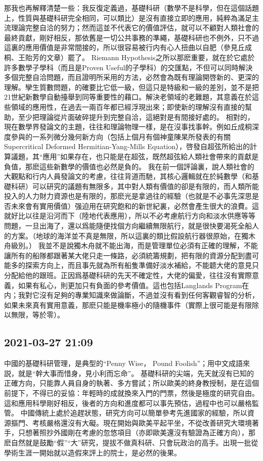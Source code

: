 \documentclass[twocolumn]{ctexart}
\begin{document}
那我也再解釋清楚一些：我反復定義過，基礎科研（數學不是科學，但在這個話題上，性質與基礎科研完全相同，可以類比）是沒有直接立即的應用，純粹為滿足主流理論完整自洽的努力；然而這並不代表它的價值評估，就可以不顧對人類社會的最終貢獻，剛好相反，那依舊是一切公共事務的準繩，基礎科研也不例外，只不過這裏的應用價值是非常間接的，所以很容易被行内有心人扭曲以自肥（參見丘成桐、王貽芳的文章）罷了。
Riemann Hypothesis之所以那麽重要，就在於它處於許多數學子學科（而且是Proven Useful的子學科）的交匯點，不但可以同時解決多個完整自洽問題，而且證明所采用的方法，必然會為既有理論開啓新的、更深的理解。孿生質數問題，的確要比它低一級，但這只是特級和一級的差別，並不是把21世紀新數學自動擡舉到同等重要性的藉口。解決老領域的老難題，其意義在於這些領域的應用性，在過去一兩百年都已經浮現出來；即使新的理解沒有直接的幫助，至少把理論從片面破碎提升到完整自洽，這絕對是有間接好處的。
相對的，現在數學界發論文的主題，往往和理論物理一樣，是在沒事找事幹。例如丘成桐深度參與的一系列微分幾何新方向（包括上個月有個神童陳杲所發表的有關Supercritical Deformed Hermitian-Yang-Mills Equation），啓發自超弦所給出的計算議題，其“應用”如果存在，也只能是在超弦，既然超弦給人類社會帶來的貢獻是負值，那麽這些新數學的價值也必然是負的。
我在前一個評論裏，說人類社會的大觀點和行内人員發論文的考慮，往往背道而馳，其核心邏輯就在於純數學（和基礎科研）可以研究的議題有無限多，其中對人類有價值的卻是有限的，而人類所能投入的人力財力資源也是有限的，那麽光是拿過往的經驗（也就是不必事先深思是否未來會有實用價值）强迫用在研究飽和的新世紀裏，必然會產生很大的浪費。這就好比以往是沿河而下（陸地代表應用），所以不必考慮航行方向和淡水供應等等問題，一旦出海了，還以爲能隨便找個方向繼續無限航行，就是很快要渴死全船人的方案。（地球的海洋並不真是無限，所以這裏的類比假設航行器很原始，在獨木舟級別。）
我並不是說獨木舟就不能出海，而是管理單位必須有正確的理解，不能讓所有的船隊都跟著某大佬只走一條路，必須統籌規劃，把有限的資源分配到盡可能多的探索方向上，而且事先就為所有船隻準備好淡水補給，不能聼大佬的意見只分配給他的跟班。正因爲基礎科研的先天不確定性，大佬的偏愛，往往沒有實際意義，如果有私心，則更加只有負面的參考價值。這也包括Langlands Program在内；我對它沒有足夠的專業知識來做論斷，不過並沒有看到任何客觀睿智的分析，如果未來真有實用意義，那麽只能是機率極小的隨機事件（實際上很可能是有限除以無限，等於零）。
\subsection*{2021-03-27 21:09}

中國的基礎科研管理，是典型的“Penny Wise， Pound Foolish”；用中文成語來説，就是“幹大事而惜身，見小利而忘命”。
基礎科研的尖端，先天就沒有已知的正確方向，只能靠人員自身的執著、多方嘗試；所以歐美的終身教授制，是在這個前提下，不得已的妥協：年輕時的成就換來入門的門票，然後是極度的研究自由。這和應用科學剛好相反，後者的方向和進度都可以事先預估，過程中也可以嚴格監管。
中國傳統上處於追趕狀態，研究方向可以簡單參考先進國家的經驗，所以資源摳門、考核嚴格還沒有大礙。現在開始與歐美平起平坐，不從改善研究大環境著手，只想著照抄外國剛在考慮的忽悠項目（亦即歐美還沒有驗證為正確方向），那麽自然就是鼓勵“假”“大”研究，提拔不做真科研、只會玩政治的高手。出現一批從學術生涯一開始就以造假來評上的院士，是必然的後果。
\end{document}

